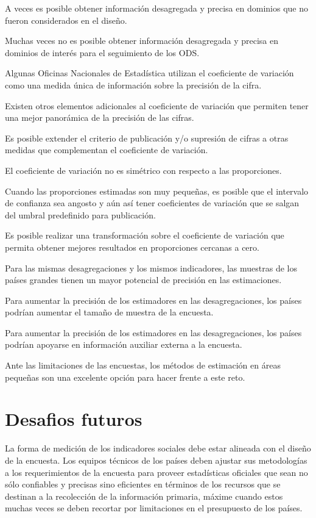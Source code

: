 A veces es posible obtener información desagregada y precisa en dominios que no fueron considerados en el diseño.

Muchas veces no es posible obtener información desagregada y precisa en dominios de interés para el seguimiento de los ODS.

Algunas Oficinas Nacionales de Estadística utilizan el coeficiente de variación como una medida única de información sobre la precisión de la cifra.

Existen otros elementos adicionales al coeficiente de variación que permiten tener una mejor panorámica de la precisión de las cifras.

Es posible extender el criterio de publicación y/o supresión de cifras a otras medidas que complementan el coeficiente de variación.

El coeficiente de variación no es simétrico con respecto a las proporciones.

Cuando las proporciones estimadas son muy pequeñas, es posible que el intervalo de confianza sea angosto y aún así tener coeficientes de variación que se salgan del umbral predefinido para publicación.

Es posible realizar una transformación sobre el coeficiente de variación que permita obtener mejores resultados en proporciones cercanas a cero.

Para las mismas desagregaciones y los mismos indicadores, las muestras de los países grandes tienen un mayor potencial de precisión en las estimaciones.

Para aumentar la precisión de los estimadores en las desagregaciones, los países podrían aumentar el tamaño de muestra de la encuesta.

Para aumentar la precisión de los estimadores en las desagregaciones, los países podrían apoyarse en información auxiliar externa a la encuesta.

Ante las limitaciones de las encuestas, los métodos de estimación en áreas pequeñas son una excelente opción para hacer frente a este reto.

\hypertarget{desafios-futuros}{%
\chapter{Desafios futuros}\label{desafios-futuros}}

La forma de medición de los indicadores sociales debe estar alineada con el diseño de la encuesta. Los equipos técnicos de los países deben ajustar sus metodologías a los requerimientos de la encuesta para proveer estadísticas oficiales que sean no sólo confiables y precisas sino eficientes en términos de los recursos que se destinan a la recolección de la información primaria, máxime cuando estos muchas veces se deben recortar por limitaciones en el presupuesto de los países.

